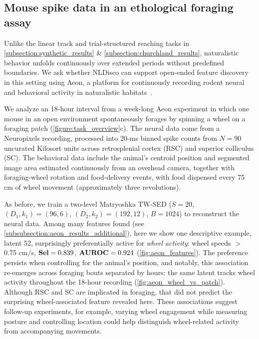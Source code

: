 \subsection{Mouse spike data in an ethological foraging assay}
\label{subsection:aeon_results}

Unlike the linear track and trial-structured reaching tasks in \hyperref[subsection:synthetic_results]{\ref*{subsection:synthetic_results}} \& \hyperref[subsection:churchland_results]{\ref*{subsection:churchland_results}}, naturalistic behavior unfolds continuously over extended periods without predefined boundaries. We ask whether NLDisco can support open-ended feature discovery in this setting using Aeon, a platform for continuously recording rodent neural and behavioral activity in naturalistic habitats~\citep{campagner_2025_aeon_platform}. 


We analyze an 18-hour interval from a week-long Aeon experiment in which one mouse in an open environment spontaneously forages by spinning a wheel on a foraging patch (\autoref{figure:task_overview}c). The neural data come from a Neuropixels recording, processed into 20-ms binned spike counts from $N=90$ uncurated Kilosort units across retrosplenial cortex (RSC) and superior colliculus (SC). The behavioral data include the animal's centroid position and segmented image area estimated continuously from an overhead camera, together with foraging-wheel rotation and food-delivery events, with food dispensed every 75 cm of wheel movement (approximately three revolutions).

As before, we train a two-level Matryoshka TW-SED ($S = 20$, $(D_1,k_1)=(96,6)$, $(D_2,k_2)=(192,12)$, $B = 1024$) to reconstruct the neural data. Among many features found (see \hyperref[subsubsection:aeon_results_additional]{\ref*{subsubsection:aeon_results_additional}}), here we show one descriptive example, latent 52, surprisingly preferentially active for \textit{wheel activity}: wheel speeds $>$ 0.75 cm/s, $\mathbf{Sel}=0.839$, $\mathbf{AUROC}=0.924$ (\autoref{fig:aeon_features}). The preference persists when controlling for the animal's position, and notably, this association re-emerges across foraging bouts separated by hours: the same latent tracks wheel activity throughout the 18-hour recording (\autoref{fig:aeon_wheel_vs_patch}). Although RSC and SC are implicated in foraging, that did not predict the surprising wheel-associated feature revealed here. These associations suggest follow-up experiments, for example, varying wheel engagement while measuring posture and controlling location could help distinguish wheel-related activity from accompanying movements.

